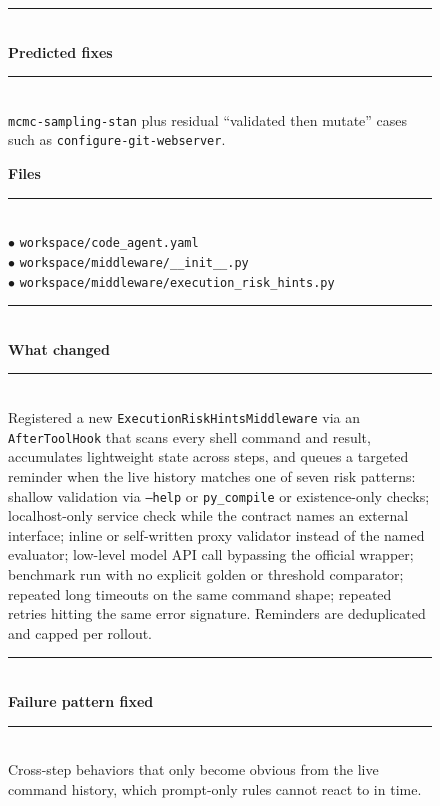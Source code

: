 \begin{figure}[t]
\begin{tcbraster}
\begin{tcolorbox}[colback=aheSky!18,colframe=aheNavy,colbacktitle=aheNavy,
                          title={\scriptsize\textbf{chg-1, iteration 6, commit \texttt{ff0cf3d}, level: tool implementation}}]
            \rule{\linewidth}{0.3pt}\\
            \textbf{\textcolor{aheNavy}{Predicted fixes}} \\
            \rule{\linewidth}{0.3pt}\\[1pt]
            \texttt{mcmc-sampling-stan} plus residual ``validated then mutate'' cases such as \texttt{configure-git-webserver}.
        \end{tcolorbox}
        \begin{tcolorbox}[colback=aheTeal!12,colframe=aheBlue,colbacktitle=aheBlue,
                          title={\scriptsize\textbf{chg-2, iteration 6, commit \texttt{9651986}, level: middleware}}]
            \textbf{\textcolor{aheBlue}{Files}} \\
            \rule{\linewidth}{0.3pt}\\[1pt]
            $\bullet$ \texttt{workspace/code\_agent.yaml} \\
            $\bullet$ \texttt{workspace/middleware/\_\_init\_\_.py} \\
            $\bullet$ \texttt{workspace/middleware/execution\_risk\_hints.py} \\[3pt]
            \rule{\linewidth}{0.3pt}\\
            \textbf{\textcolor{aheBlue}{What changed}} \\
            \rule{\linewidth}{0.3pt}\\[1pt]
            Registered a new \texttt{ExecutionRiskHintsMiddleware} via an \texttt{AfterToolHook} that scans every shell command and result, accumulates lightweight state across steps, and queues a targeted reminder when the live history matches one of seven risk patterns: shallow validation via \texttt{--help} or \texttt{py\_compile} or existence-only checks; localhost-only service check while the contract names an external interface; inline or self-written proxy validator instead of the named evaluator; low-level model API call bypassing the official wrapper; benchmark run with no explicit golden or threshold comparator; repeated long timeouts on the same command shape; repeated retries hitting the same error signature. Reminders are deduplicated and capped per rollout. \\[3pt]
            \rule{\linewidth}{0.3pt}\\
            \textbf{\textcolor{aheBlue}{Failure pattern fixed}} \\
            \rule{\linewidth}{0.3pt}\\[1pt]
            Cross-step behaviors that only become obvious from the live command history, which prompt-only rules cannot react to in time. \\[3pt]

\end{tcolorbox}
\end{tcbraster}
\end{figure}
